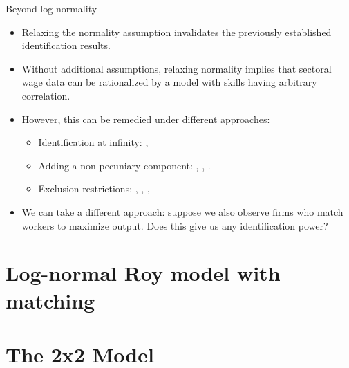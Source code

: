 \documentclass[aspectratio=169]{beamer}
\begin{document}
\begin{frame}{Beyond log-normality}
	\begin{itemize}
		\item Relaxing the normality assumption invalidates the previously established identification results. \citep{heckman1990empirical}
		\smallskip
		\item Without additional assumptions, relaxing normality implies that sectoral wage data can be rationalized by a model with skills having arbitrary correlation.
		\smallskip
		\item However, this can be remedied under different approaches:
		\begin{itemize}
			\smallskip
			\item Identification at infinity: \citet{heckman1990empirical} \citet{french2011identification}, \citet{d2013another}
			\smallskip
			\item Adding a non-pecuniary component: \citet{heckman2007econometric} \citet{d2013inference}, \citet{bayer2011nonparametric}, \citet{lee2023nonparametric}.
			\smallskip
			\item Exclusion restrictions: \citet{heckman1990empirical}, \citet{buera2006non}, \citet{french2011identification}, \citet{mourifie2020sharp}
		\end{itemize}
		\smallskip
		\item We can take a different approach: suppose we also observe firms who match workers to maximize output. Does this give us any identification power?
	\end{itemize}
\end{frame}

\section{Log-normal Roy model with matching}

\section{The 2x2 Model}
\end{document}
